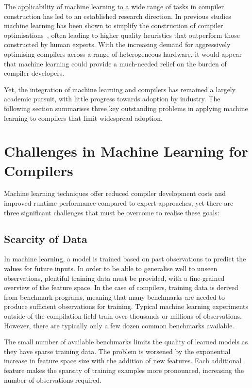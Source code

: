 The applicability of machine learning to a wide range of tasks in compiler construction has led to an established research direction. In previous studies machine learning has been shown to simplify the construction of compiler optimisations~\cite{Ashouri2018,Wang2018}, often leading to higher quality heuristics that outperform those constructed by human experts. With the increasing demand for aggressively optimising compilers across a range of heterogeneous hardware, it would appear that machine learning could provide a much-needed relief on the burden of compiler developers.

Yet, the integration of machine learning and compilers has remained a largely academic pursuit, with little progress towards adoption by industry. The following section summarises three key outstanding problems in applying machine learning to compilers that limit widespread adoption.


\newpage
\section{Challenges in Machine Learning for Compilers}
\label{sec:intro-challenges}

Machine learning techniques offer reduced compiler development costs and improved runtime performance compared to expert approaches, yet there are three significant challenges that must be overcome to realise these goals:

\subsection{Scarcity of Data}
\label{subsec:challenge-scarcity}

In machine learning, a model is trained based on past observations to predict the values for future inputs. In order to be able to generalise well to unseen observations, plentiful training data must be provided, with a fine-grained overview of the feature space. In the case of compilers, training data is derived from benchmark programs, meaning that many benchmarks are needed to produce sufficient observations for training. Typical machine learning experiments outside of the compilation field train over thousands or millions of observations. However, there are typically only a few dozen common benchmarks available.

The small number of available benchmarks limits the quality of learned models as they have sparse training data. The problem is worsened by the exponential increase in feature space size with the addition of new features. Each additional feature makes the sparsity of training examples more pronounced, increasing the number of observations required.

